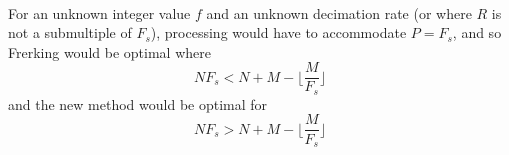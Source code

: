 \documentclass{article}
\begin{document}
        \paragraph{}
        For an unknown integer value $f$ and an unknown decimation rate (or where $R$ is not a submultiple of ${F}_s$), processing would have to accommodate $P = {F}_s$, and so Frerking would be optimal where
        \begin{equation}
        N{F}_s < N + M - \lfloor{\frac{M}{{F}_s}}\rfloor
        \end{equation}
        and the new method would be optimal for
        \begin{equation}
        N{F}_s > N + M - \lfloor{\frac{M}{{F}_s}}\rfloor
        \end{equation}
\end{document}
